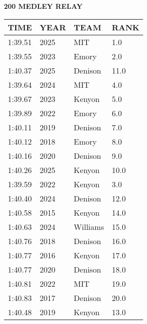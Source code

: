 \begin{center}
\begin{minipage}[t]{0.7\textwidth}
\centering
\textbf{200 MEDLEY RELAY}\\[0.05cm]
\begin{tabular}{@{}p{1.8cm}p{1.2cm}p{1.4cm}p{0.8cm}@{}}
\hline
\textbf{TIME} & \textbf{YEAR} & \textbf{TEAM} & \textbf{RANK} \\
\hline
1:39.51 & 2025 & MIT & 1.0 \\
1:39.55 & 2023 & Emory & 2.0 \\
1:40.37 & 2025 & Denison & 11.0 \\
1:39.64 & 2024 & MIT & 4.0 \\
1:39.67 & 2023 & Kenyon & 5.0 \\
1:39.89 & 2022 & Emory & 6.0 \\
1:40.11 & 2019 & Denison & 7.0 \\
1:40.12 & 2018 & Emory & 8.0 \\
1:40.16 & 2020 & Denison & 9.0 \\
1:40.26 & 2025 & Kenyon & 10.0 \\
1:39.59 & 2022 & Kenyon & 3.0 \\
1:40.40 & 2024 & Denison & 12.0 \\
1:40.58 & 2015 & Kenyon & 14.0 \\
1:40.63 & 2024 & Williams & 15.0 \\
1:40.76 & 2018 & Denison & 16.0 \\
1:40.77 & 2016 & Kenyon & 17.0 \\
1:40.77 & 2020 & Denison & 18.0 \\
1:40.81 & 2022 & MIT & 19.0 \\
1:40.83 & 2017 & Denison & 20.0 \\
1:40.48 & 2019 & Kenyon & 13.0 \\
\hline
\end{tabular}
\end{minipage}
\end{center}

\vspace{0.4cm}

